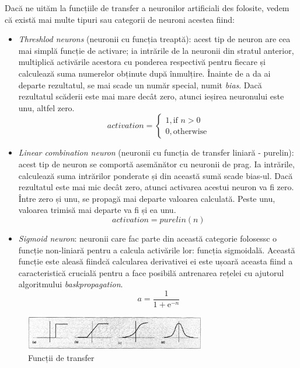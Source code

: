 Dacă ne uităm la funcțiile de transfer a neuronilor artificiali des folosite, vedem că există mai multe tipuri sau categorii de neuroni acestea fiind:
\begin{itemize}
	\item \textit{Threshlod neurons} (neuronii cu funcția treaptă): acest tip de neuron are cea mai simplă funcție de activare; ia intrările de la neuronii din stratul anterior, multiplică activările acestora cu ponderea respectivă pentru fiecare și calculează suma numerelor obținute după înmulțire. Înainte de a da ai departe rezultatul, se mai scade un număr special, numit \textit{bias}. Dacă rezultatul scăderii este mai mare decât zero, atunci ieșirea neuronului este unu, altfel zero.
\begin{equation}
	activation =
		\begin{cases}
			1, \text{if } n > 0 \\
			0, \text{otherwise}
		\end{cases}
\end{equation}
	\item \textit{Linear combination neuron} (neuronii cu funcția de transfer liniară - purelin): acest tip de neuron se comportă asemănător cu neuronii de prag. Ia intrările, calculează suma intrărilor ponderate și din această sumă scade bias-ul. Dacă rezultatul este mai mic decât zero, atunci activarea acestui neuron va fi zero. Între zero și unu, se propagă mai departe valoarea calculată. Peste unu, valoarea trimisă mai departe va fi și ea unu.
\begin{equation}
	activation = purelin(n)
\end{equation}
	\item \textit{Sigmoid neuron}:  neuronii care fac parte din această categorie folosessc o funcție non-liniară pentru a calcula activările lor: funcția sigmoidală. Această funcție este aleasă fiindcă calcularea derivativei ei este ușoară aceasta fiind a caracteristică crucială pentru a face posibilă antrenarea rețelei cu ajutorul algoritmului \textit{baskpropagation}.
\begin{equation}
	a = \frac{1}{1 + \mathrm{e}^{-n}}
\end{equation}
\end{itemize}

\begin{figure}[h!]
    	\centering
	\captionsetup{justification=centering, margin=2cm}
	\includegraphics[width=0.7\textwidth]{figures/activation_functions.png}
	\caption{Funcții de transfer \cite{activationFunctions}}
	\label{fig:activationFunctions}
\end{figure}



